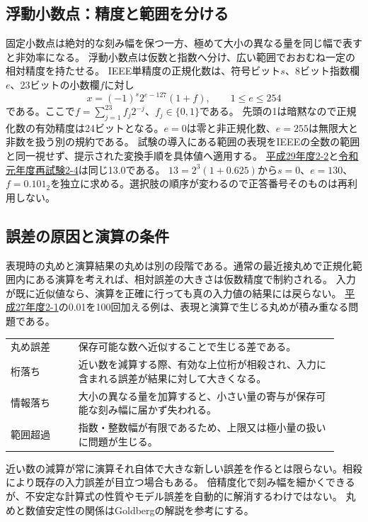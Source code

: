 \subsection{浮動小数点：精度と範囲を分ける}\label{theory:information:floating}
固定小数点は絶対的な刻み幅を保つ一方、極めて大小の異なる量を同じ幅で表すと非効率になる。
浮動小数点は仮数と指数へ分け、広い範囲でおおむね一定の相対精度を持たせる。
IEEE単精度の正規化数は、符号ビット$s$、8ビット指数欄$e$、23ビットの小数欄$f$に対し
\[
 x=(-1)^s2^{e-127}(1+f),\qquad 1\le e\le254
\]
である。ここで$f=\sum_{j=1}^{23}f_j2^{-j}$、$f_j\in\{0,1\}$である。
先頭の1は暗黙なので正規化数の有効精度は24ビットとなる。$e=0$は零と非正規化数、$e=255$は無限大と非数を扱う別の規約である\cite{oracle_single}。
試験の導入にある範囲の表現をIEEEの全数の範囲と同一視せず、提示された変換手順を具体値へ適用する。
\hyperref[q:h29-reg-basic-2-2]{平成29年度2-2}と\hyperref[q:r01-ret-basic-2-4]{令和元年度再試験2-4}は同じ13.0である。
$13=2^3(1+0.625)$から$s=0$、$e=130$、$f=0.101_2$を独立に求める。選択肢の順序が変わるので正答番号そのものは再利用しない。

\subsection{誤差の原因と演算の条件}\label{theory:information:error}
表現時の丸めと演算結果の丸めは別の段階である。通常の最近接丸めで正規化範囲内にある演算を考えれば、相対誤差の大きさは仮数精度で制約される。
入力が既に近似値なら、演算を正確に行っても真の入力値の結果には戻らない。
\hyperref[q:h27-reg-basic-2-1]{平成27年度2-1}の0.01を100回加える例は、表現と演算で生じる丸めが積み重なる問題である。
\begin{center}
\begin{tabular}{p{0.19\linewidth}p{0.73\linewidth}}
丸め誤差 & 保存可能な数へ近似することで生じる差である。\\
桁落ち & 近い数を減算する際、有効な上位桁が相殺され、入力に含まれる誤差が結果に対して大きくなる。\\
情報落ち & 大小の異なる量を加算すると、小さい量の寄与が保存可能な刻み幅に届かず失われる。\\
範囲超過 & 指数・整数幅が有限であるため、上限又は極小量の扱いに問題が生じる。\\
\end{tabular}
\end{center}
近い数の減算が常に演算それ自体で大きな新しい誤差を作るとは限らない。相殺により既存の入力誤差が目立つ場合もある。
倍精度化で刻み幅を細かくできるが、不安定な計算式の性質やモデル誤差を自動的に解消するわけではない。
丸めと数値安定性の関係はGoldbergの解説を参考にする\cite{goldberg1991}。

